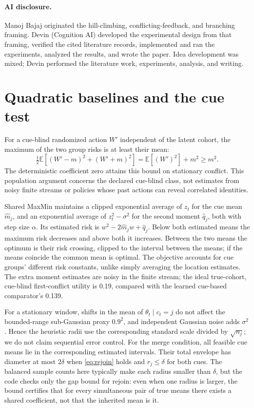 \documentclass[11pt]{article}
\newcommand{\E}{\mathbb{E}}
\begin{document}
\paragraph{AI disclosure.}
Manoj Bajaj originated the hill-climbing, conflicting-feedback, and branching framing. Devin (Cognition AI) developed the experimental design from that framing, verified the cited literature records, implemented and ran the experiments, analyzed the results, and wrote the paper. Idea development was mixed; Devin performed the literature work, experiments, analysis, and writing.




\appendix
\section{Quadratic baselines and the cue test}
\label{app:math}
For a cue-blind randomized action \(W'\) independent of the latent cohort, the maximum of the two group risks is at least their mean:
\[
 \tfrac12 \E[(W'-m)^2+(W'+m)^2]=\E[(W')^2]+m^2\ge m^2 .
\]
The deterministic coefficient zero attains this bound on stationary conflict. This population argument concerns the declared cue-blind class, not estimates from noisy finite streams or policies whose past actions can reveal correlated identities.

Shared MaxMin maintains a clipped exponential average of \(z_t\) for the cue mean \(\hat m_j\), and an exponential average of \(z_t^2-\sigma^2\) for the second moment \(\hat q_j\), both with step size \(\alpha\). Its estimated risk is \(w^2-2\hat m_jw+\hat q_j\). Below both estimated means the maximum risk decreases and above both it increases. Between the two means the optimum is their risk crossing, clipped to the interval between the means; if the means coincide the common mean is optimal. The objective accounts for cue groups' different risk constants, unlike simply averaging the location estimates. The extra moment estimates are noisy in the finite stream; the ideal true-cohort, cue-blind first-conflict utility is 0.19, compared with the learned cue-based comparator's 0.139.

For a stationary window, shifts in the mean of \(\theta_t\mid c_t=j\) do not affect the bounded-range sub-Gaussian proxy \(0.9^2\), and independent Gaussian noise adds \(\sigma^2\). Hence the heuristic radii use the corresponding standard scale divided by \(\sqrt{n_j}\); we do not claim sequential error control. For the merge condition, all feasible cue means lie in the corresponding estimated intervals. Their total envelope has diameter at most \(2\delta\) when \cref{eq:rejoin} holds and \(r_j\le\delta\) for both cues. The balanced sample counts here typically make each radius smaller than \(\delta\), but the code checks only the gap bound for rejoin: even when one radius is larger, the bound certifies that for every simultaneous pair of true means there exists a shared coefficient, not that the inherited mean is it.
\end{document}
